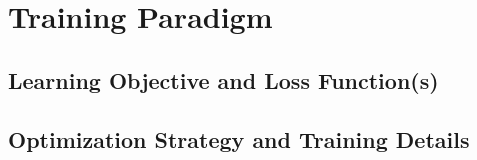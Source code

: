 \section{Training Paradigm}
\label{sec:model_training_paradigm}
    \subsection{Learning Objective and Loss Function(s)}
    \label{sec:model_loss_functions}
    \subsection{Optimization Strategy and Training Details}
    \label{sec:model_optimization_details}
    